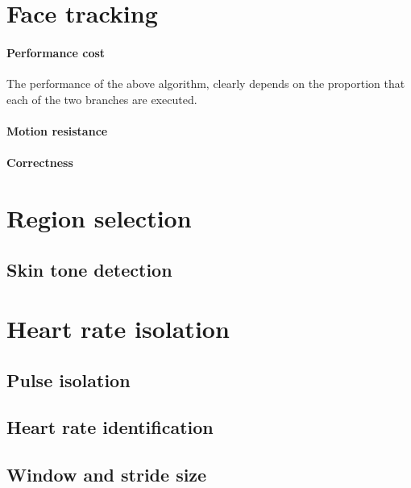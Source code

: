 \section{Face tracking}
\label{section:face_tracking}
\paragraph{Performance cost}
The performance of the above algorithm, clearly depends on the proportion that each of the two branches are executed.
\paragraph{Motion resistance}

\paragraph{Correctness}

\section{Region selection}
\label{section:region_selection}

\subsection{Skin tone detection}
\label{section:skin_tone_detection}

\section{Heart rate isolation}
\subsection{Pulse isolation}
\label{section:bss}
\label{section:ica_assumption}
\subsection{Heart rate identification}
\subsection{Window and stride size}

